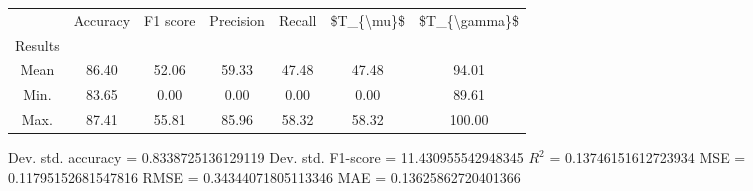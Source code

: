 \begin{tabular}{|c|c|c|c|c|c|c|}
\toprule
{} &  Accuracy &  F1 score &  Precision &  Recall &  \$T\_\{\textbackslash mu\}\$ &  \$T\_\{\textbackslash gamma\}\$ \\
Results &           &           &            &         &            &               \\
\hline
Mean    &     86.40 &     52.06 &      59.33 &   47.48 &      47.48 &         94.01 \\
Min.    &     83.65 &      0.00 &       0.00 &    0.00 &       0.00 &         89.61 \\
Max.    &     87.41 &     55.81 &      85.96 &   58.32 &      58.32 &        100.00 \\
\bottomrule
\end{tabular}

 Dev. std. accuracy = 0.8338725136129119
 Dev. std. F1-score = 11.430955542948345
 $R^2$ = 0.13746151612723934
 MSE = 0.11795152681547816
 RMSE = 0.34344071805113346
 MAE = 0.13625862720401366